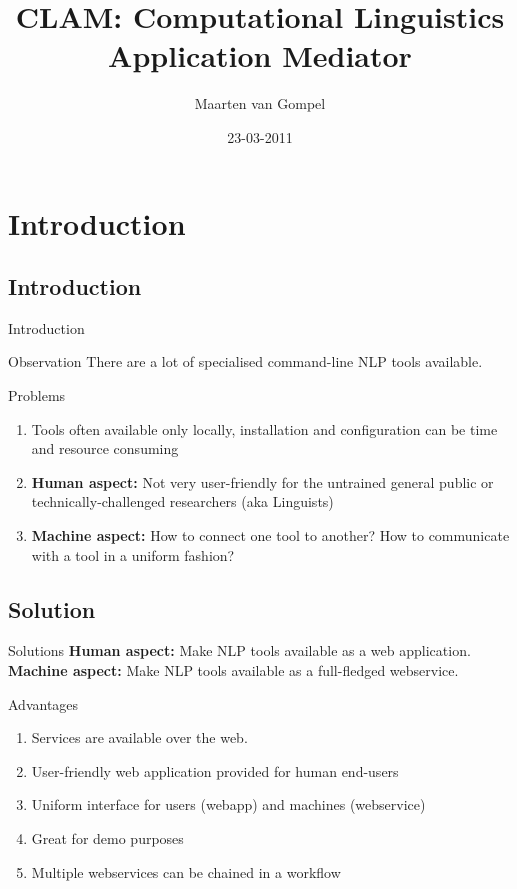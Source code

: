 \documentclass[compress]{beamer}
\title{CLAM: Computational Linguistics Application Mediator}
\author{Maarten van Gompel}
\date{23-03-2011}
\begin{document}
\begin{frame}
	\titlepage\smallraccoon\ilkuvt
\end{frame}

\section{Introduction}

\subsection{Introduction}
\begin{frame}{Introduction}

    \begin{block}{Observation}
        There are a lot of specialised command-line NLP tools available.
    \end{block}

    \begin{block}{Problems}        
        \begin{enumerate}        
            \item Tools often available only locally, installation and configuration can be time and resource consuming
            \item \textbf{Human aspect:} Not very user-friendly for the untrained general public or technically-challenged researchers (aka Linguists)
            \item \textbf{Machine aspect:} How to connect one tool to another? How to communicate with a tool in a uniform fashion?
        \end{enumerate}
    \end{block}
\end{frame}


\subsection{Solution}
\begin{frame}
    \begin{block}{Solutions} 
        \textbf{Human aspect:}   Make NLP tools available as a web application.
        \textbf{Machine aspect:} Make NLP tools available as a full-fledged webservice.
    \end{block}

    \begin{block}{Advantages}

        \begin{enumerate}
            \item Services are available over the web.
            \item User-friendly web application provided for human end-users
            \item Uniform interface for users (webapp) and machines (webservice)
            \item Great for demo purposes
            \item Multiple webservices can be chained in a workflow
        \end{enumerate}

    \end{block}
\end{frame}
\end{document}
